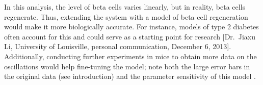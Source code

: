 In this analysis, the level of beta cells varies linearly, but in reality,
beta cells regenerate. Thus, extending the system with a model of beta cell
regeneration would make it more biologically accurate. For instance, models
of type 2 diabetes often account for this and could serve as a starting
point for research [Dr.\ Jiaxu Li, University of Louisville, personal
  communication, December 6, 2013]. Additionally, conducting further
experiments in mice to obtain more data on the oscillations would help
fine-tuning the model; note both the large error bars in the original data
(see introduction) and the parameter sensitivity of this model
\cite{Mahaffy2007}.
